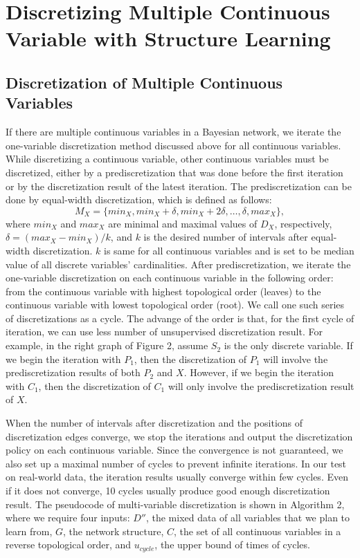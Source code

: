 \section{Discretizing Multiple Continuous Variable with Structure Learning}
\label{DMC_SL}
\subsection{Discretization of Multiple Continuous Variables}
\label{DMC}
If there are multiple continuous variables in a Bayesian network, we iterate the one-variable discretization method discussed above for all continuous variables. While discretizing a continuous variable, other continuous variables must be discretized, either by a prediscretization that was done before the first iteration or by the discretization result of the latest iteration. The prediscretization can be done by equal-width discretization, which is defined as follows:
\begin{equation}
M_X =  \{ min_X, min_X + \delta, min_X + 2\delta, \ldots, \delta, max_X \},
\end{equation}
where $min_X$ and $max_X$ are minimal and maximal values of $D_X$, respectively, $\delta =  (max_X - min_X)/k$, and $k$ is the desired number of intervals after equal-width discretization. $k$ is same for all continuous variables and is set to be median value of all discrete variables' cardinalities. After prediscretization, we iterate the one-variable discretization on each continuous variable in the following order: from the continuous variable with highest topological order (leaves) to the continuous variable with lowest topological order (root). We call one such series of discretizations as a cycle. The advange of the order is that, for the first cycle of iteration, we can use less number of unsupervised discretization result. For example, in the right graph of Figure 2, assume $S_2$ is the only discrete variable. If we begin the iteration with $P_1$, then the discretization of $P_1$ will involve the prediscretization results of both $P_2$ and $X$. However, if we begin the iteration with $C_1$, then the discretization of $C_1$ will only involve the prediscretization result of $X$.

When the number of intervals after discretization and the positions of discretization edges converge, we stop the iterations and output the discretization policy on each continuous variable. Since the convergence is not guaranteed, we also set up a maximal number of cycles to prevent infinite iterations. In our test on real-world data, the iteration results usually converge within few cycles. Even if it does not converge, 10 cycles usually produce good enough discretization result. The pseudocode of multi-variable discretization is shown in Algorithm 2, where we require four inputs: $D''$, the mixed data of all variables that we plan to learn from, $G$, the network structure, $C$, the set of all continuous variables in a reverse topological order, and $u_{cycle}$, the upper bound of times of cycles.

